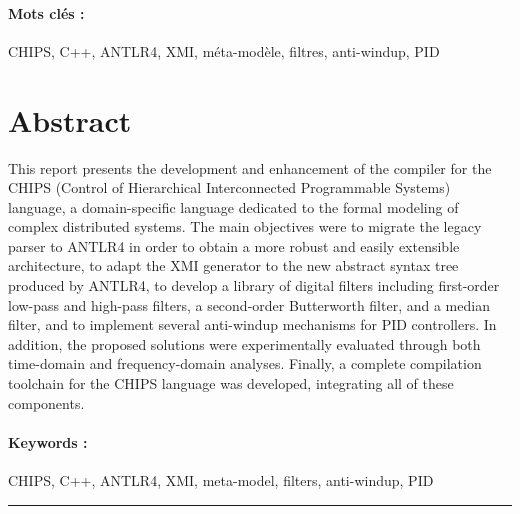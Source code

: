 \documentclass[a4paper, 11pt]{article}
\begin{document}
\paragraph{\textbf{Mots clés :}} CHIPS, C++, ANTLR4, XMI, méta-modèle, filtres, anti-windup, PID 
\vspace{1cm}

\section*{Abstract}

This report presents the development and enhancement of the compiler for the CHIPS (Control of Hierarchical Interconnected Programmable Systems) 
language, a domain-specific language dedicated to the formal modeling of complex distributed systems. The main objectives were to migrate the legacy 
parser to ANTLR4 in order to obtain a more robust and easily extensible architecture, to adapt the XMI generator to the new abstract syntax tree 
produced by ANTLR4, to develop a library of digital filters including first-order low-pass and high-pass filters, a second-order Butterworth filter, 
and a median filter, and to implement several anti-windup mechanisms for PID controllers. In addition, the proposed solutions were experimentally 
evaluated through both time-domain and frequency-domain analyses. Finally, a complete compilation toolchain for the CHIPS language was developed, 
integrating all of these components.

\paragraph{\textbf{Keywords :}} CHIPS, C++, ANTLR4, XMI, meta-model, filters, anti-windup, PID


\vspace{0.2cm}
\rule{\textwidth}{0.5pt}

\FloatBarrier


\clearpage
\end{document}
